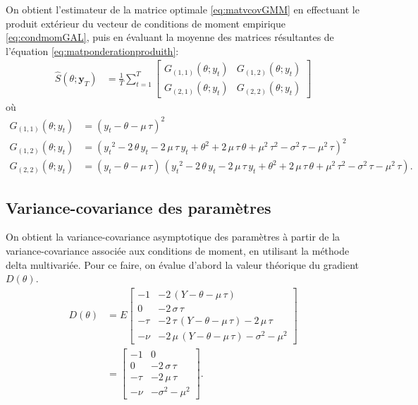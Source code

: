 On obtient l'estimateur de la matrice optimale \eqref{eq:matvcovGMM}
en effectuant le produit extérieur du vecteur de conditions de moment
empirique \eqref{eq:condmomGAL}, puis en évaluant la moyenne des
matrices résultantes de l'équation \eqref{eq:matponderationproduith}:
\begin{align}
  \label{eq:matvcovGMMemp1}
  \hat{S}(\theta;\mathbf{y}_T) &= \frac{1}{T} \sum_{t=1}^T
  \left[\begin{array}{cc}
      G_{(1,1)}(\theta;y_t) & G_{(1,2)}(\theta;y_t) \\
      G_{(2,1)}(\theta;y_t) & G_{(2,2)}(\theta;y_t)
    \end{array} \right]
\end{align}
où
\begin{align*}
  G_{(1,1)}(\theta;y_t) &=\left( y_t-\theta-\mu\,\tau\right)^{2} \\
  G_{(1,2)}(\theta;y_t) &=\left( {y_t}^{2}-2\,\theta\,y_t-2\,\mu\,\tau\,y_t+{\theta}^{2}+2\,\mu\,\tau\,\theta+{\mu}^{2}\,{\tau}^{2}-{\sigma}^{2}\,\tau-{\mu}^{2}\,\tau\right)^{2} \\
  G_{(2,2)}(\theta;y_t) &=\left( y_t-\theta-\mu\,\tau\right) \,\left(
    {y_t}^{2}-2\,\theta\,y_t-2\,\mu\,\tau\,y_t+{\theta}^{2}+2\,\mu\,\tau\,\theta+{\mu}^{2}\,{\tau}^{2}-{\sigma}^{2}\,\tau-{\mu}^{2}\,\tau\right).
\end{align*}


\subsection{Variance-covariance des paramètres}

On obtient la variance-covariance asymptotique des paramètres à partir
de la variance-covariance associée aux conditions de moment, en
utilisant la méthode delta multivariée. Pour ce faire, on évalue
d'abord la valeur théorique du gradient $D(\theta)$.
\begin{align}
  D(\theta) &= E \left[ \begin{array}{cc}
      -1 & -2\,\left( Y-\theta-\mu\,\tau\right) \\
      0 & -2\,\sigma\,\tau \\
      -\tau & -2\,\tau\,\left( Y-\theta-\mu\,\tau\right) -2\,\mu\,\tau \\
      -\nu & -2\,\mu\,\left( Y-\theta-\mu\,\tau\right)
      -{\sigma}^{2}-{\mu}^{2}
    \end{array}\right] \nonumber\\
  &= \left[ \begin{array}{cc}
      -1 & 0 \\
      0 & -2\,\sigma\,\tau \\
      -\tau & -2\,\mu\,\tau \\
      -\nu & -{\sigma}^{2}-{\mu}^{2}
    \end{array}\right].
\end{align}

